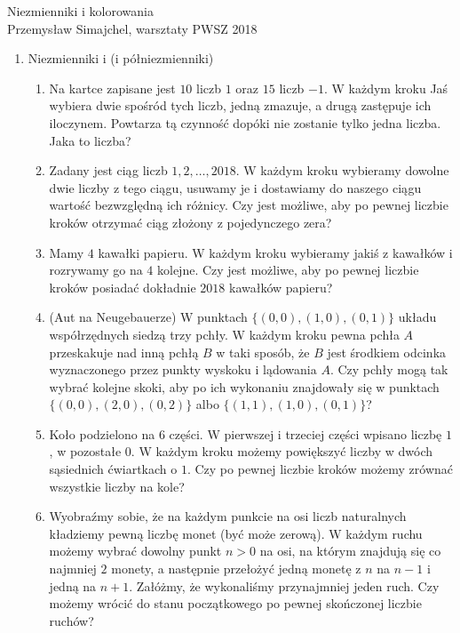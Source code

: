 \documentclass{article}
\begin{document}
{\begin{center}\LARGE Niezmienniki i kolorowania \\\large Przemysław Simajchel, warsztaty PWSZ 2018 \smallskip\end{center}}
		\begin{enumerate}
			\item \large{Niezmienniki i (i półniezmienniki)} \normalsize
			
			\begin{enumerate}[1.]		
				\item Na kartce zapisane jest $10$ liczb $1$ oraz $15$ liczb $-1$. W każdym kroku Jaś wybiera dwie spośród tych liczb, jedną zmazuje, a drugą zastępuje ich iloczynem. Powtarza tą czynność dopóki nie zostanie tylko jedna liczba. Jaka to liczba?
				
				\item Zadany jest ciąg liczb $1, 2, \ldots , 2018$. W każdym kroku wybieramy dowolne dwie liczby z tego ciągu, usuwamy je i dostawiamy do naszego ciągu wartość bezwzględną ich różnicy. Czy jest możliwe, aby po pewnej liczbie kroków otrzymać ciąg złożony z pojedynczego zera?
				
				\item Mamy $4$ kawałki papieru. W każdym kroku wybieramy jakiś z kawałków i rozrywamy go na $4$ kolejne. Czy jest możliwe, aby po pewnej liczbie kroków posiadać dokładnie $2018$ kawałków papieru?

				\item (Aut na Neugebauerze) W punktach $\{(0, 0), (1, 0), (0, 1)\}$ układu współrzędnych siedzą trzy pchły. W każdym kroku pewna pchła $A$ przeskakuje nad inną pchłą $B$ w taki sposób, że $B$ jest środkiem odcinka wyznaczonego przez punkty wyskoku i lądowania $A$. Czy pchły mogą tak wybrać kolejne skoki, aby po ich wykonaniu znajdowały się w punktach $\{(0, 0), (2, 0), (0, 2)\}$ albo $\{(1, 1), (1, 0), (0, 1)\}$? 

				\item Koło podzielono na $6$ części. W pierwszej i trzeciej części wpisano liczbę $1$, w pozostałe $0$. W każdym kroku możemy powiększyć liczby w dwóch sąsiednich ćwiartkach o $1$. Czy po pewnej liczbie kroków możemy zrównać wszystkie liczby na kole?

				\item Wyobraźmy sobie, że na każdym punkcie na osi liczb naturalnych kładziemy pewną liczbę monet (być może zerową). W każdym ruchu możemy wybrać dowolny punkt $n > 0$ na osi, na którym znajdują się co najmniej $2$ monety, a następnie przełożyć jedną monetę z $n$ na $n-1$ i jedną na $n+1$. Załóżmy, że wykonaliśmy przynajmniej jeden ruch. Czy możemy wrócić do stanu początkowego po pewnej skończonej liczbie ruchów?


\end{enumerate}
\end{enumerate}
\end{document}
